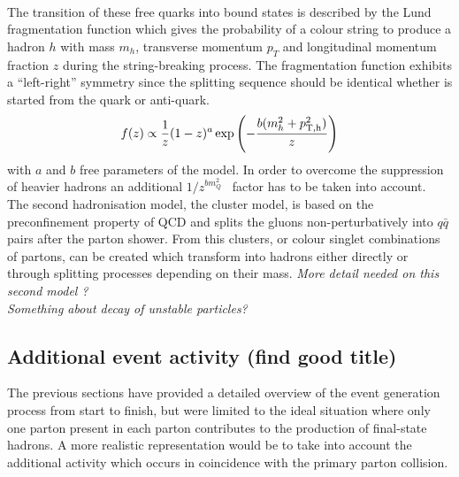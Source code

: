 \\
The transition of these free quarks into bound states is described by the Lund fragmentation function which gives the probability of a colour string to produce a hadron $h$ with mass $m_{h}$, transverse momentum $p_{T}$ and longitudinal momentum fraction $z$ during the string-breaking process. The fragmentation function exhibits a ``left-right'' symmetry since the splitting sequence should be identical whether is started from the quark or anti-quark.
\begin{equation}
 f(z) \propto \frac{1}{z} (1-z)^{a} \exp \left( - \frac{b(m_{h}^{2} + p_{\rm T,h}^{2})}{z} \right)
\end{equation}
with $a$ and $b$ free parameters of the model.
In order to overcome the suppression of heavier hadrons an additional $1/z^{bm_{Q}^{2}}$~\cite{} factor has to be taken into account.
\\
The second hadronisation model, the cluster model, is based on the preconfinement property of QCD and splits the gluons non-perturbatively into $q\bar{q}$ pairs after the parton shower. From this clusters, or colour singlet combinations of partons, can be created which transform into hadrons either directly or through splitting processes depending on their mass. 
\textit{More detail needed on this second model ?}
\\
\textit{Something about decay of unstable particles?}

\subsection{Additional event activity (find good title)}%

The previous sections have provided a detailed overview of the event generation process from start to finish, but were limited to the ideal situation where only one parton present in each parton contributes to the production of final-state hadrons. A more realistic representation would be to take into account the additional activity which occurs in coincidence with the primary parton collision. 
\\

